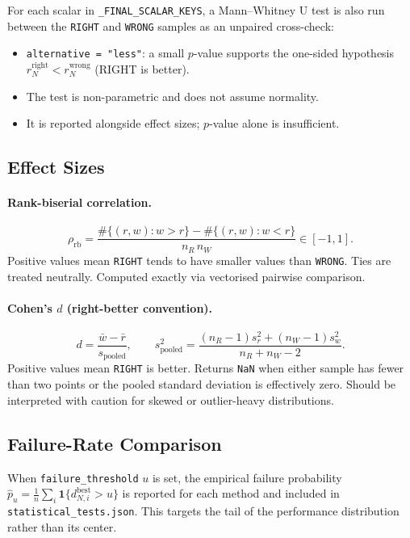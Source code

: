 \documentclass[11pt]{article}
\newcommand{\RIGHT}{\texttt{RIGHT}}
\newcommand{\WRONG}{\texttt{WRONG}}
\begin{document}
For each scalar in \texttt{\_FINAL\_SCALAR\_KEYS}, a Mann--Whitney U test
is also run between the \RIGHT{} and \WRONG{} samples as an unpaired cross-check:
\begin{itemize}
  \item \texttt{alternative = "less"}: a small $p$-value supports the one-sided
        hypothesis $r_N^{\mathrm{right}} < r_N^{\mathrm{wrong}}$ (RIGHT is better).
  \item The test is non-parametric and does not assume normality.
  \item It is reported alongside effect sizes; $p$-value alone is insufficient.
\end{itemize}
 
\subsection{Effect Sizes}
 
\paragraph{Rank-biserial correlation.}
\[
  \rho_{\mathrm{rb}}
  = \frac{\#\{(r,w): w > r\} - \#\{(r,w): w < r\}}{n_R\,n_W}
  \in [-1,1].
\]
Positive values mean \RIGHT{} tends to have smaller values than \WRONG{}.
Ties are treated neutrally. Computed exactly via vectorised pairwise comparison.
 
\paragraph{Cohen's $d$ (right-better convention).}
\[
  d = \frac{\bar{w} - \bar{r}}{s_{\mathrm{pooled}}},
  \qquad
  s_{\mathrm{pooled}}^2
  = \frac{(n_R-1)s_r^2 + (n_W-1)s_w^2}{n_R + n_W - 2}.
\]
Positive values mean \RIGHT{} is better.
Returns \texttt{NaN} when either sample has fewer than two points or the pooled
standard deviation is effectively zero. Should be interpreted with caution for
skewed or outlier-heavy distributions.
 
\subsection{Failure-Rate Comparison}
 
When \texttt{failure\_threshold} $u$ is set, the empirical failure probability
$\hat{p}_u = \frac{1}{n}\sum_i \mathbf{1}\{d_{N,i}^{\mathrm{best}} > u\}$
is reported for each method and included in \texttt{statistical\_tests.json}.
This targets the tail of the performance distribution rather than its center.
 
\end{document}
